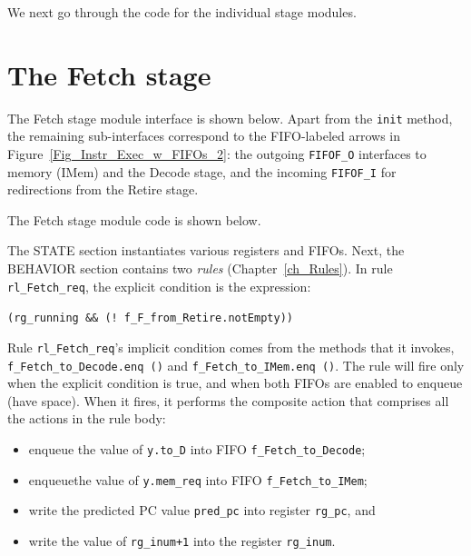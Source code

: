 We next go through the code for the individual stage modules.


\section{The Fetch stage}

\label{Sec_Fife_Fetch_stage}

The Fetch stage module interface is shown below.  Apart from the
\verb|init| method, the remaining sub-interfaces correspond to the
FIFO-labeled arrows in Figure~\ref{Fig_Instr_Exec_w_FIFOs_2}: the
outgoing \verb|FIFOF_O| interfaces to memory (IMem) and the Decode
stage, and the incoming \verb|FIFOF_I| for redirections from the
Retire stage.



The Fetch stage module code is shown below.



The STATE section instantiates various registers and FIFOs.  Next, the
BEHAVIOR section contains two \emph{rules} (Chapter~\ref{ch_Rules}).
In rule \verb|rl_Fetch_req|, the explicit condition is the expression:

\hm\small \verb|(rg_running && (! f_F_from_Retire.notEmpty))|

Rule \verb|rl_Fetch_req|'s implicit condition comes from the methods
that it invokes, \verb|f_Fetch_to_Decode.enq ()| and
\verb|f_Fetch_to_IMem.enq ()|.  The rule will fire only when the
explicit condition is true, and when both FIFOs are enabled to enqueue
(have space).  When it fires, it performs the composite action that
comprises all the actions in the rule body:


\begin{itemize}

 \item enqueue the value of \verb|y.to_D| into FIFO \verb|f_Fetch_to_Decode|;

 \item enqueuethe value of \verb|y.mem_req| into FIFO \verb|f_Fetch_to_IMem|;

 \item write the predicted PC value \verb|pred_pc| into register \verb|rg_pc|, and

 \item write the value of \verb|rg_inum+1| into the register \verb|rg_inum|.

\end{itemize}

